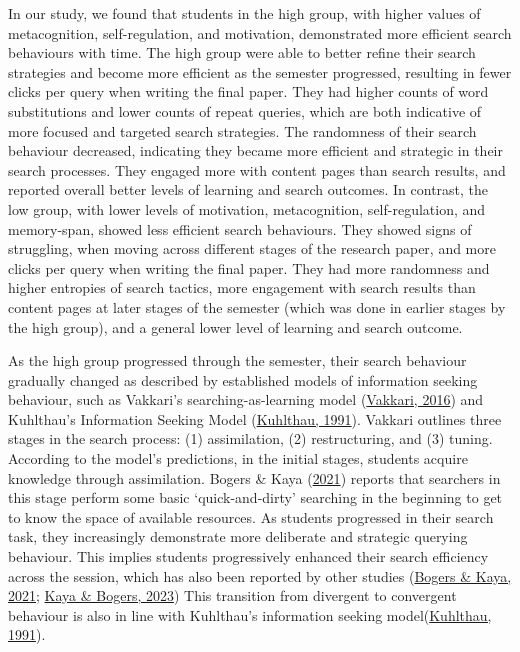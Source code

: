 \documentclass[letterpaper, nobind]{templates/ociamthesis}
\begin{document}
In our study, we found that students in the high group, with higher values of metacognition, self-regulation, and motivation, demonstrated more efficient search behaviours with time.
The high group were able to better refine their search strategies and become more efficient as the semester progressed, resulting in fewer clicks per query when writing the final paper.
They had higher counts of word substitutions and lower counts of repeat queries, which are both indicative of more focused and targeted search strategies.
The randomness of their search behaviour decreased, indicating they became more efficient and strategic in their search processes.
They engaged more with content pages than search results, and reported overall better levels of learning and search outcomes.
In contrast, the low group, with lower levels of motivation, metacognition, self-regulation, and memory-span, showed less efficient search behaviours.
They showed signs of struggling, when moving across different stages of the research paper, and more clicks per query when writing the final paper.
They had more randomness and higher entropies of search tactics, more engagement with search results than content pages at later stages of the semester (which was done in earlier stages by the high group), and a general lower level of learning and search outcome.

As the high group progressed through the semester, their search behaviour gradually changed as described by established models of information seeking behaviour, such as Vakkari's searching-as-learning model (\protect\hyperlink{ref-vakkari2016searching}{Vakkari, 2016}) and Kuhlthau's Information Seeking Model (\protect\hyperlink{ref-kuhlthau1991inside}{Kuhlthau, 1991}).
Vakkari outlines three stages in the search process:
(1) assimilation,
(2) restructuring, and
(3) tuning.
According to the model's predictions, in the initial stages, students acquire knowledge through assimilation.
Bogers \& Kaya (\protect\hyperlink{ref-bogers2021exploration}{2021}) reports that searchers in this stage perform some basic `quick-and-dirty' searching in the beginning to get to know the space of available resources.
As students progressed in their search task, they increasingly demonstrate more deliberate and strategic querying behaviour.
This implies students progressively enhanced their search efficiency across the session, which has also been reported by other studies (\protect\hyperlink{ref-bogers2021exploration}{Bogers \& Kaya, 2021}; \protect\hyperlink{ref-kaya2023understanding}{Kaya \& Bogers, 2023})
This transition from divergent to convergent behaviour is also in line with Kuhlthau's information seeking model(\protect\hyperlink{ref-kuhlthau1991inside}{Kuhlthau, 1991}).
\end{document}
